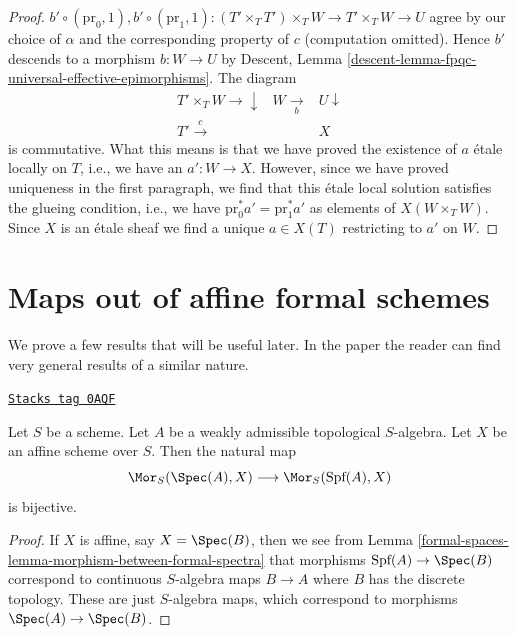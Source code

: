 \begin{proof}
$b' \circ (\text{pr}_0, 1),
b' \circ (\text{pr}_1, 1) :
(T' \times_T T') \times_T W \to T' \times_T W \to U$
agree by our choice of $\alpha$ and the corresponding property of $c$
(computation omitted). Hence $b'$ descends to a morphism $b : W \to U$ by
Descent, Lemma \ref{descent-lemma-fpqc-universal-effective-epimorphisms}.
The diagram
$$
\begin{array}{ccc}T' \times_T W \longrightarrow\downarrow & W \underset{b}{\longrightarrow} & U \downarrow \\ T' \overset{c}{\longrightarrow} &  & X\end{array}
$$
is commutative. What this means is that we have proved the existence
of $a$ \'etale locally on $T$, i.e., we have an $a' : W \to X$.
However, since we have proved uniqueness
in the first paragraph, we find that this \'etale local solution
satisfies the glueing condition, i.e., we have
$\text{pr}_0^*a' = \text{pr}_1^*a'$ as elements of $X(W \times_T W)$.
Since $X$ is an \'etale sheaf we find a unique $a \in X(T)$ restricting
to $a'$ on $W$.
\end{proof}

\section{Maps out of affine formal schemes}
\label{formal-spaces-section-map-out-of}
We prove a few results that will be useful later.
In the paper \cite{Bhatt-Algebraize} the reader can find
very general results of a similar nature.

\begin{lemma}
\label{formal-spaces-lemma-map-into-affine}
\href{https://stacks.math.columbia.edu/tag/0AQF}{\texttt{Stacks tag 0AQF}}

Let $S$ be a scheme. Let $A$ be a weakly admissible topological
$S$-algebra. Let $X$ be an affine scheme over $S$. Then
the natural map
$$
\Mor_S(\Spec(A), X)
\longrightarrow
\Mor_S(\text{Spf}(A), X)
$$
is bijective.
\end{lemma}

\begin{proof}
If $X$ is affine, say $X = \Spec(B)$, then we see from
Lemma \ref{formal-spaces-lemma-morphism-between-formal-spectra}
that morphisms $\text{Spf}(A) \to \Spec(B)$ correspond to continuous
$S$-algebra maps $B \to A$ where $B$ has the discrete topology.
These are just $S$-algebra maps, which correspond to morphisms
$\Spec(A) \to \Spec(B)$.
\end{proof}


